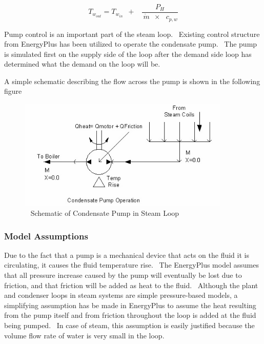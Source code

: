 \begin{equation}
{T_{{w_{out}}}} = {T_{{w_{in}}}}\,\,\, + \,\,\,\,\,\frac{{{P_H}}}{{\,\dot m\,\,\, \times \,\,\,\,{c_{p,w}}}}
\end{equation}

Pump control is an important part of the steam loop.~ Existing control structure from EnergyPlus has been utilized to operate the condensate pump.~ The pump is simulated first on the supply side of the loop after the demand side loop has determined what the demand on the loop will be.

A simple schematic describing the flow across the pump is shown in the following figure

\begin{figure}[hbtp] %
\centering
\includegraphics[width=0.9\textwidth, height=0.9\textheight, keepaspectratio=true]{media/image2040.png}
\caption{  Schematic of Condensate Pump in Steam Loop \protect \label{fig:schematic-of-condensate-pump-in-steam-loop}}
\end{figure}

\subsubsection{Model Assumptions}\label{model-assumptions-1}

Due to the fact that a pump is a mechanical device that acts on the fluid it is circulating, it causes the fluid temperature rise.~ The EnergyPlus model assumes that all pressure increase caused by the pump will eventually be lost due to friction, and that friction will be added as heat to the fluid.~ Although the plant and condenser loops in steam systems are simple pressure-based models, a simplifying assumption has be made in EnergyPlus to assume the heat resulting from the pump itself and from friction throughout the loop is added at the fluid being pumped.~ In case of steam, this assumption is easily justified because the volume flow rate of water is very small in the loop.

